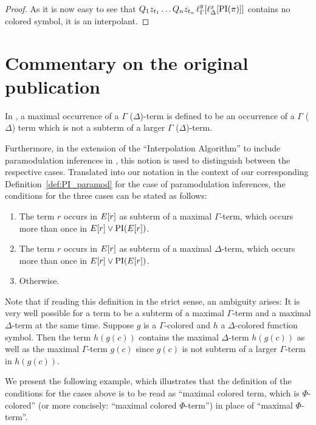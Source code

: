 \begin{proof}
	As it is now easy to see that $Q_1 z_{t_1} \dots Q_n z_{t_n}\,\ell_{\Gamma}^{y}[\ell_{\Delta}^{x}[\operatorname{PI}(\pi)]]$ contains no colored symbol, it is an interpolant.
\end{proof}




\section{Commentary on the original publication}
\label{sec:huang_commentary} 


In \cite[Definition 3]{Huang95}, a maximal occurrence of a $\Gamma$ ($\Delta$)-term is defined to be an occurrence of a $\Gamma$ ($\Delta$) term which is not a subterm of a larger $\Gamma$ ($\Delta$)-term.

Furthermore, in the extension of the ``Interpolation Algorithm'' to include paramodulation inferences in \cite[p.~183]{Huang95}, this notion is used to distinguish between the respective cases.
Translated into our notation in the context of our corresponding Definition~\ref{def:PI_paramod} for the case of paramodulation inferences, the conditions for the three cases can be stated as follows:
\begin{enumerate}
	\item The term $r$ occurs in $E[r]$ as subterm of a maximal $\Gamma$-term, which occurs more than once in $E[r] \lor \operatorname{PI}(E[r])$.
		\label{case_1}
	\item The term $r$ occurs in $E[r]$ as subterm of a maximal $\Delta$-term, which occurs more than once in $E[r] \lor \operatorname{PI}(E[r])$.
	\item Otherwise.
\end{enumerate}

Note that if reading this definition in the strict sense, an ambiguity arises:
It is very well possible for a term to be a subterm of a maximal $\Gamma$-term and a maximal $\Delta$-term at the same time.
Suppose $g$ is a $\Gamma$-colored and $h$ a $\Delta$-colored function symbol.
Then the term $h(g(c))$ contains the maximal $\Delta$-term $h(g(c))$ as well as the maximal $\Gamma$-term $g(c)$ since $g(c)$ is not subterm of a larger $\Gamma$-term in\nolinebreak{} $h(g(c))$.

We present the following example, which illustrates that the definition of the conditions for the cases above is to be read as ``maximal colored term, which is $\Phi$-colored'' (or more concisely: ``maximal colored $\Phi$-term'') in place of ``maximal $\Phi$-term''.


